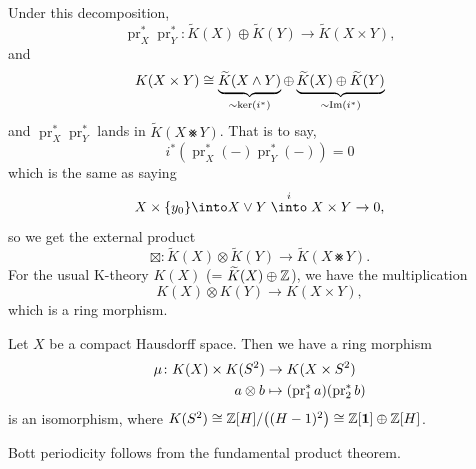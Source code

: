 \begin{node}
Under this decomposition,
\begin{equation}
\operatorname{pr}_{X}^{*}\operatorname{pr}_{Y}^{*}\colon\widetilde{K}(X)\oplus\widetilde{K}(Y)\to\widetilde{K}(X\times Y),
\end{equation}
and
\begin{equation}
K(X\times Y)\cong\underbrace{\widetilde{K}(X\mathbin{\wedge} Y)}_{\sim\ker(i^{*})}\oplus\underbrace{\widetilde{K}(X)\oplus\widetilde{K}(Y)}_{\sim\operatorname{Im}(i^{*})}
\end{equation}
and $\operatorname{pr}_{X}^{*}\operatorname{pr}_{Y}^{*}$ lands in
$\widetilde{K}(X\smashtimes Y)$. That is to say,
\begin{equation}
i^{*}(\operatorname{pr}_{X}^{*}(-)\operatorname{pr}_{Y}^{*}(-))=0
\end{equation}
which is the same as saying
\begin{equation}
X\times\{y_{0}\}\into X\wedgetimes Y\stackrel{i}{\into}X\times Y\to0,
\end{equation}
so we get the external product
\begin{equation}
\boxtimes\colon\widetilde{K}(X)\otimes\widetilde{K}(Y)\to\widetilde{K}(X\smashtimes Y).
\end{equation}
For the usual K-theory $K(X)$ (= $\widetilde{K}(X)\oplus\mathbb{Z}$), we have
the multiplication
\begin{equation}
K(X)\otimes K(Y)\to K(X\times Y),
\end{equation}
which is a ring morphism.
\end{node}

\begin{theorem}
Let $X$ be a compact Hausdorff space. Then we have a ring morphism
\begin{equation}
\begin{split}
\mu\colon K(X)\times K(S^{2})&\to K(X\times S^{2})\\
a\otimes b&\mapsto(\operatorname{pr}_{1}^{*}a)(\operatorname{pr}_{2}^{*}b)
\end{split}
\end{equation}
is an isomorphism, where $K(S^{2})\cong\mathbb{Z}[H]/\bigl((H-1)^{2}\bigr)\cong\mathbb{Z}[\mathbf{1}]\oplus\mathbb{Z}[H]$.
\end{theorem}

\begin{claim}
Bott periodicity follows from the fundamental product theorem.
\end{claim}

